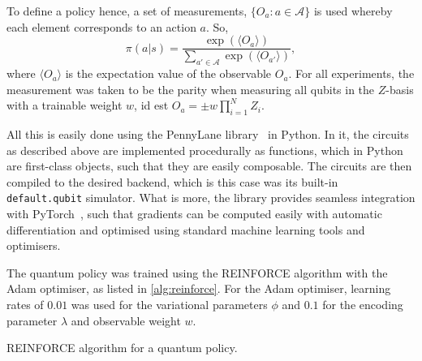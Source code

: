 To define a policy hence, a set of measurements, $\{O_a : a \in \mathcal{A}\}$ is used whereby each element corresponds to an action $a$.
So,
\begin{equation}
    \pi(a|s) = \frac{\exp\left(\langle O_a \rangle\right)}{\sum_{a' \in \mathcal{A}} \exp\left(\langle O_{a'} \rangle\right)},
\end{equation}
where $\langle O_a \rangle$ is the expectation value of the observable $O_a$.
For all experiments, the measurement was taken to be the parity when measuring all qubits in the $Z$-basis with a trainable weight $w$, id est $O_a = \pm w \prod_{i=1}^N Z_i$.

All this is easily done using the PennyLane library~\autocite{pennylane} in Python.
In it, the circuits as described above are implemented procedurally as functions, which in Python are first-class objects, such that they are easily composable.
The circuits are then compiled to the desired backend, which is this case was its built-in \texttt{default.qubit} simulator.
What is more, the library provides seamless integration with PyTorch~\autocite{pytorch}, such that gradients can be computed easily with automatic differentiation and optimised using standard machine learning tools and optimisers.

The quantum policy was trained using the REINFORCE algorithm with the Adam optimiser, as listed in \cref{alg:reinforce}.
For the Adam optimiser, learning rates of $0.01$ was used for the variational parameters $\phi$ and $0.1$ for the encoding parameter $\lambda$ and observable weight $w$.

\begin{algorithm}
    \SetAlgoLined
    \caption{REINFORCE algorithm for a quantum policy.}
    \label{alg:reinforce}
\end{algorithm}